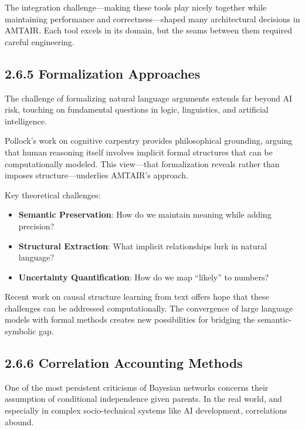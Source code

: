 \documentclass[
  11pt,
  letterpaper,
]{book}
\providecommand{\tightlist}{%
  \setlength{\itemsep}{0pt}\setlength{\parskip}{0pt}}
\begin{document}
The integration challenge---making these tools play nicely together
while maintaining performance and correctness---shaped many
architectural decisions in AMTAIR. Each tool excels in its domain, but
the seams between them required careful engineering.

\subsection{2.6.5 Formalization Approaches}\label{sec-formalization}

The challenge of formalizing natural language arguments extends far
beyond AI risk, touching on fundamental questions in logic, linguistics,
and artificial intelligence.

Pollock's work on cognitive carpentry \textcite{pollock1995} provides
philosophical grounding, arguing that human reasoning itself involves
implicit formal structures that can be computationally modeled. This
view---that formalization reveals rather than imposes
structure---underlies AMTAIR's approach.

Key theoretical challenges:

\begin{itemize}
\tightlist
\item
  \textbf{Semantic Preservation}: How do we maintain meaning while
  adding precision?
\item
  \textbf{Structural Extraction}: What implicit relationships lurk in
  natural language?
\item
  \textbf{Uncertainty Quantification}: How do we map ``likely'' to
  numbers?
\end{itemize}

Recent work on causal structure learning from text
\textcite{babakov2025} \textcite{ban2023} \textcite{bethard2007} offers
hope that these challenges can be addressed computationally. The
convergence of large language models with formal methods creates new
possibilities for bridging the semantic-symbolic gap.

\subsection{2.6.6 Correlation Accounting
Methods}\label{sec-correlation-methods}

One of the most persistent criticisms of Bayesian networks concerns
their assumption of conditional independence given parents. In the real
world, and especially in complex socio-technical systems like AI
development, correlations abound.
\end{document}
